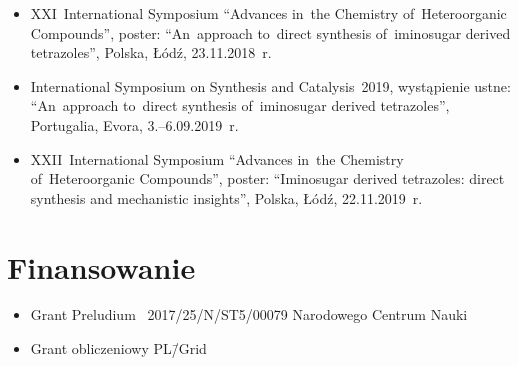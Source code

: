 \begin{fullwidth}
\begin{itemize}
  \item XXI~International Symposium \enquote{Advances in~the Chemistry of~Heteroorganic Compounds}, poster: \enquote{An~approach to~direct synthesis of~iminosugar derived tetrazoles}, Polska, Łódź, 23.11.2018~r.
  \item International Symposium on Synthesis and Catalysis~2019, wystąpienie ustne: \enquote{An~approach to~direct synthesis of~iminosugar derived tetrazoles}, Portugalia, Evora, 3.\-–6.09.2019~r.
  \item XXII~International Symposium \enquote{Advances in~the Chemistry of~Heteroorganic Compounds}, poster: \enquote{Iminosugar derived tetrazoles: direct synthesis and mechanistic insights}, Polska, Łódź, 22.11.2019~r.
\end{itemize}
\end{fullwidth}

\section{Finansowanie}\label{intro:founding}
\begin{fullwidth}
\begin{itemize}
  \item Grant Preludium \textnumero~2017/25/N/ST5/00079 Narodowego Centrum Nauki
  \item Grant obliczeniowy PL\=/Grid
\end{itemize}
\end{fullwidth}

\begin{fullwidth}
  \printglossary[title=Wykaz skrótów, type=\acronymtype]
\end{fullwidth}
  